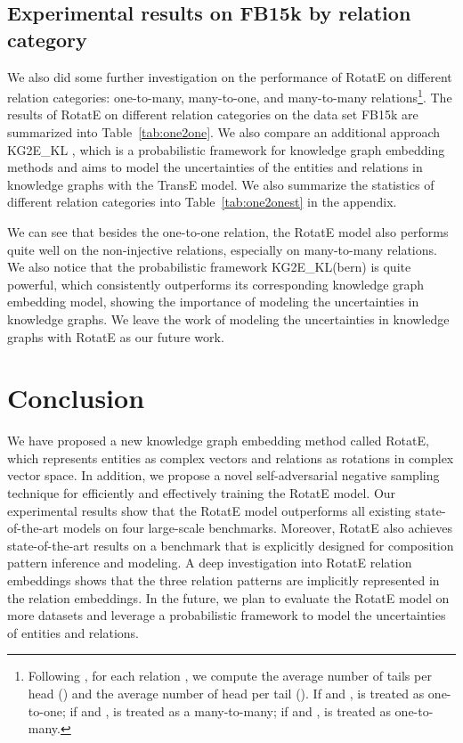 \documentclass{article} \usepackage{iclr2019_conference,times}
\def\method{RotatE}
\begin{document}
\subsection{Experimental results on FB15k by relation category}




We also did some further investigation on the performance of RotatE on different relation categories: one-to-many, many-to-one, and many-to-many relations\footnote{Following \cite{wang2014knowledge}, for each relation , we compute the average number of tails per head () and the average number of head per tail (). If  and ,  is treated as one-to-one; if  and ,  is treated as a many-to-many; if  and ,  is treated as one-to-many.}. 
The results of RotatE on different relation categories on the data set FB15k are summarized into Table~\ref{tab:one2one}. We also compare an additional approach KG2E\_KL \citep{he2015learning}, which is a probabilistic framework for knowledge graph embedding methods and aims to model the uncertainties of the entities and relations in knowledge graphs with the TransE model. We also summarize the statistics of different relation categories into Table~\ref{tab:one2onest} in the appendix.

We can see that besides the one-to-one relation, the RotatE model also performs quite well on the non-injective relations, especially on many-to-many relations. We also notice that the probabilistic framework KG2E\_KL(bern) \citep{he2015learning} is quite powerful, which consistently outperforms its corresponding knowledge graph embedding model, showing the importance of modeling the uncertainties in knowledge graphs. We leave the work of modeling the uncertainties in knowledge graphs with RotatE as our future work.  




\section{Conclusion}
We have proposed a new knowledge graph embedding method called \method{}, which represents entities as complex vectors and relations as rotations in complex vector space. In addition, we propose a novel self-adversarial negative sampling technique for efficiently and effectively training the RotatE model. Our experimental results show that the \method{} model outperforms all existing state-of-the-art models on four large-scale benchmarks. Moreover, \method{} also achieves state-of-the-art results on a benchmark that is explicitly designed for composition pattern inference and modeling. A deep investigation into \method{} relation embeddings shows that the three relation patterns are implicitly represented in the relation embeddings. In the future, we plan to evaluate the \method{} model on more datasets and leverage a probabilistic framework to model the uncertainties of entities and relations.
\end{document}
